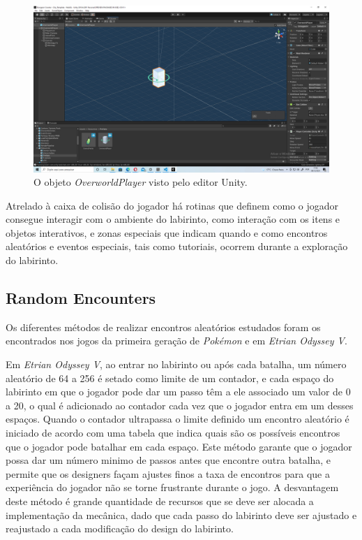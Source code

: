 \begin{figure}[h!]
 \centering
  \includegraphics[width=0.65\linewidth]{playerobject.jpg}
  \caption{O objeto \emph{OverworldPlayer} visto pelo editor Unity.}
  \label{fig:playerobject}
\end{figure}

Atrelado à caixa de colisão do jogador há rotinas que definem como o jogador consegue interagir com o ambiente do labirinto, como interação com os itens e objetos interativos, e zonas especiais que indicam quando e como encontros aleatórios e eventos especiais, tais como tutoriais, ocorrem durante a exploração do labirinto.

\subsection{Random Encounters}

Os diferentes métodos de realizar encontros aleatórios estudados foram os encontrados nos jogos da primeira geração de \emph{Pokémon} e em \emph{Etrian Odyssey V}.

Em \emph{Etrian Odyssey V}, ao entrar no labirinto ou após cada batalha, um número aleatório de 64 a 256 é setado como limite de um contador, e cada espaço do labirinto em que o jogador pode dar um passo têm a ele associado um valor de 0 a 20, o qual é adicionado ao contador cada vez que o jogador entra em um desses espaços. Quando o contador ultrapassa o limite definido um encontro aleatório é iniciado de acordo com uma tabela que indica quais são os possíveis encontros que o jogador pode batalhar em cada espaço. Este método garante que o jogador possa dar um número minimo de passos antes que encontre outra batalha, e permite que os designers façam ajustes finos a taxa de encontros para que a experiência do jogador não se torne frustrante durante o jogo. A desvantagem deste método é grande quantidade de recursos que se deve ser alocada a implementação da mecânica, dado que cada passo do labirinto deve ser ajustado e reajustado a cada modificação do design do labirinto.

